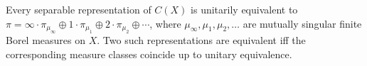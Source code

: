 Every separable representation of $C(X)$ is unitarily equivalent to $\pi = \infty \cdot \pi_{\mu_\infty} \oplus 1 \cdot \pi_{\mu_1} \oplus 2 \cdot \pi_{\mu_2} \oplus \cdots$, where $\mu_\infty, \mu_1, \mu_2, \ldots$ are mutually singular finite Borel measures on $X$. Two such representations are equivalent iff the corresponding measure classes coincide up to unitary equivalence.
